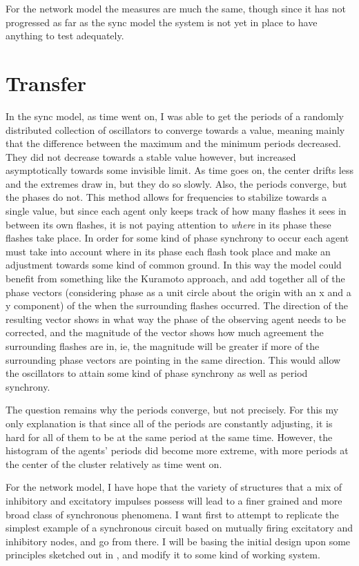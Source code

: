 \documentclass[12pt]{article}
\begin{document}
For the network model the measures are much the same, though since it has not progressed as far as the sync model the system is not yet in place to have anything to test adequately.

\section{Transfer}

In the sync model, as time went on, I was able to get the periods of a randomly distributed collection of oscillators to converge towards a value, meaning mainly that the difference between the maximum and the minimum periods decreased.  They did not decrease towards a stable value however, but increased asymptotically towards some invisible limit.  As time goes on, the center drifts less and the extremes draw in, but they do so slowly.  Also, the periods converge, but the phases do not.  This method allows for frequencies to stabilize towards a single value, but since each agent only keeps track of how many flashes it sees in between its own flashes, it is not paying attention to {\em where} in its phase these flashes take place.  In order for some kind of phase synchrony to occur each agent must take into account where in its phase each flash took place and make an adjustment towards some kind of common ground.  In this way the model could benefit from something like the Kuramoto approach, and add together all of the phase vectors (considering phase as a unit circle about the origin with an x and a y component) of the when the surrounding flashes occurred.  The direction of the resulting vector shows in what way the phase of the observing agent needs to be corrected, and the magnitude of the vector shows how much agreement the surrounding flashes are in, ie, the magnitude will be greater if more of the surrounding phase vectors are pointing in the same direction.  This would allow the oscillators to attain some kind of phase synchrony as well as period synchrony.  

The question remains why the periods converge, but not precisely.  For this my only explanation is that since all of the periods are constantly adjusting, it is hard for all of them to be at the same period at the same time.  However, the histogram of the agents' periods did become more extreme, with more periods at the center of the cluster relatively as time went on.  

For the network model, I have hope that the variety of structures that a mix of inhibitory and excitatory impulses possess will lead to a finer grained and more broad class of synchronous phenomena.  I want first to attempt to replicate the simplest example of a synchronous circuit based on mutually firing excitatory and inhibitory nodes, and go from there.  I will be basing the initial design upon some principles sketched out in \cite{Buzsaki}, and modify it to some kind of working system.
\end{document}
